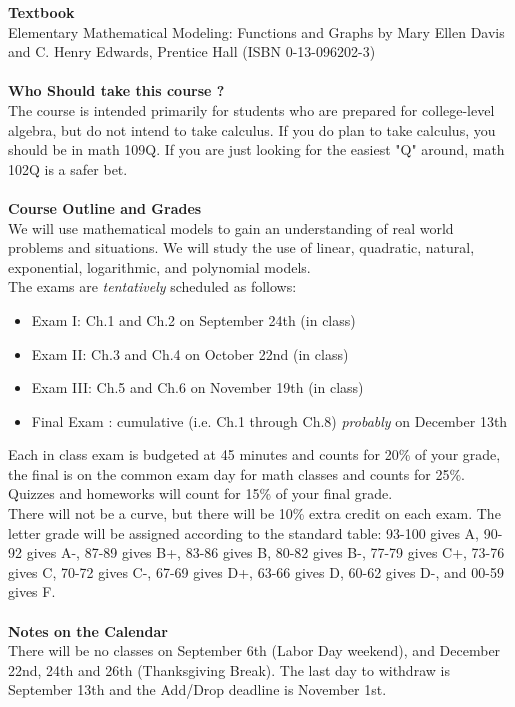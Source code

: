 \documentclass [11pt]{article}
\begin{document}
   {\bf Textbook}\\
   Elementary Mathematical Modeling: Functions and Graphs by Mary Ellen Davis and C. Henry Edwards, 
   Prentice Hall (ISBN 0-13-096202-3) \\
   \ \\

   {\bf Who Should take this course ?}\\
   The course is intended primarily for students who are prepared for college-level algebra, but do not intend 
   to take calculus. If you do plan to take calculus, you should be in math 109Q. If you are just looking for
   the easiest "Q" around, math 102Q is a safer bet. \\
   \ \\

   {\bf Course Outline and Grades}\\
   We will use mathematical models to gain an understanding of real world problems and situations. We will 
   study the use of linear, quadratic, natural, exponential, logarithmic, and polynomial models. \\
   The exams are {\it tentatively} scheduled as follows:
   \begin{itemize}
     \item Exam I: Ch.1 and Ch.2 on September 24th (in class)
     \item Exam II: Ch.3 and Ch.4 on October 22nd (in class)
     \item Exam III: Ch.5 and Ch.6 on November 19th (in class)
     \item Final Exam : cumulative (i.e. Ch.1 through Ch.8) {\it probably} on December 13th
   \end{itemize}
   Each in class exam is budgeted at 45 minutes and counts for 20\% of your grade,
   the final is on the common exam day for math classes and counts for 25\%.
   Quizzes and homeworks will count for 15\% of your final grade.\\
   There will not be a curve, but there will be 10\% extra credit on each exam.
   The letter grade will be assigned according to the standard table:   
   93-100 gives A, 90-92 gives A-, 87-89 gives B+, 83-86 gives B, 80-82 gives B-,
   77-79 gives C+, 73-76 gives C, 70-72 gives C-, 67-69 gives D+, 63-66 gives D,
   60-62 gives D-, and 00-59 gives F.\\
   \ \\

   {\bf Notes on the Calendar}\\
   There will be no classes on September 6th (Labor Day weekend), and December 22nd, 24th and 26th
   (Thanksgiving Break). The last day to withdraw is September 13th and the Add/Drop deadline
   is November 1st. \\
   \ \\  
 
\end{document}
